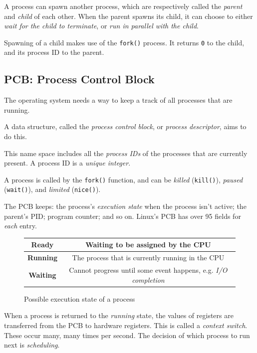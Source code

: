 \documentclass[a4]{article}
\begin{document}
A process can spawn another process, which are respectively called the \textit{parent} and \textit{child} of each other. When the parent spawns its child, it can choose to either \textit{wait for the child to terminate}, or \textit{run in parallel with the child}.

Spawning of a child makes use of the \texttt{fork()} process. It returns \texttt{0} to the child, and its process ID to the parent.

\subsection{PCB: Process Control Block}

The operating system needs a way to keep a track of all processes that are running.

A data structure, called the \textit{process control block}, or \textit{process descriptor}, aims to do this.

This name space includes all the \textit{process IDs} of the processes that are currently present. A process ID is a \textit{unique integer}.

A process is called by the \texttt{fork()} function, and can be \textit{killed} (\texttt{kill()}), \textit{paused} (\texttt{wait()}), and \textit{limited} (\texttt{nice()}).

The PCB keeps: the process's \textit{execution state} when the process isn't active; the parent's PID; program counter; and so on. Linux's PCB has over 95 fields for \textit{each} entry.

\begin{figure}[H]
  \begin{center}
    \begin{tabular}{|c|c|}
      \hline
      \textbf{Ready} & Waiting to be assigned by the CPU\\
      \hline
      \textbf{Running} & The process that is currently running in the CPU\\
      \hline
      \textbf{Waiting} & Cannot progress until some event happens, e.g. \textit{I/O completion}\\
      \hline
    \end{tabular}
    \caption{Possible execution state of a process}
  \end{center}
\end{figure}

When a process is returned to the \textit{running} state, the values of registers are transferred from the PCB to hardware registers. This is called a \textit{context switch}. These occur many, many times per second. The decision of which process to run next is \textit{scheduling}.
\end{document}
